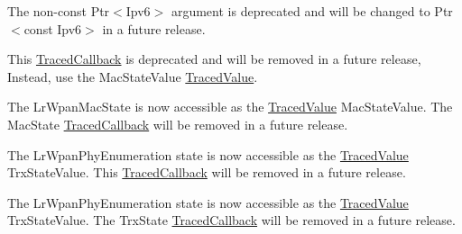 \begin{DoxyRefList}
\item[\label{deprecated__deprecated000011}%
\hypertarget{deprecated__deprecated000011}{}%
Member \hyperlink{classns3_1_1Ipv6L3Protocol_a5b967a1009f9c57047f135573fd5519f}{ns3\+:\+:Ipv6\+L3\+Protocol\+:\+:Tx\+Rx\+Traced\+Callback} )(Ptr$<$ const Packet $>$ packet, Ptr$<$ Ipv6 $>$ ipv6, uint32\+\_\+t interface)]The non-\/const {\ttfamily Ptr$<$\+Ipv6$>$} argument is deprecated and will be changed to {\ttfamily Ptr$<$const Ipv6$>$} in a future release.  
\item[\label{deprecated__deprecated000017}%
\hypertarget{deprecated__deprecated000017}{}%
Member \hyperlink{classns3_1_1LrWpanMac_a7545ecfb4bdf7436739d00507872d248}{ns3\+:\+:Lr\+Wpan\+Mac\+:\+:m\+\_\+mac\+State\+Logger} ]This \hyperlink{classns3_1_1TracedCallback}{Traced\+Callback} is deprecated and will be removed in a future release, Instead, use the {\ttfamily Mac\+State\+Value} \hyperlink{classns3_1_1TracedValue}{Traced\+Value}.  
\item[\label{deprecated__deprecated000016}%
\hypertarget{deprecated__deprecated000016}{}%
Member \hyperlink{classns3_1_1LrWpanMac_ad847a4537bebb10c39f656f1ebdb87f5}{ns3\+:\+:Lr\+Wpan\+Mac\+:\+:State\+Traced\+Callback} )(Lr\+Wpan\+Mac\+State old\+State, Lr\+Wpan\+Mac\+State new\+State)]The Lr\+Wpan\+Mac\+State is now accessible as the \hyperlink{classns3_1_1TracedValue}{Traced\+Value} {\ttfamily Mac\+State\+Value}. The {\ttfamily Mac\+State} \hyperlink{classns3_1_1TracedCallback}{Traced\+Callback} will be removed in a future release.  
\item[\label{deprecated__deprecated000019}%
\hypertarget{deprecated__deprecated000019}{}%
Member \hyperlink{classns3_1_1LrWpanPhy_ae48d12b3f7dd9ebc93ae1a7e0d570f52}{ns3\+:\+:Lr\+Wpan\+Phy\+:\+:m\+\_\+trx\+State\+Logger} ]The Lr\+Wpan\+Phy\+Enumeration state is now accessible as the \hyperlink{classns3_1_1TracedValue}{Traced\+Value} {\ttfamily Trx\+State\+Value}. This \hyperlink{classns3_1_1TracedCallback}{Traced\+Callback} will be removed in a future release.  
\item[\label{deprecated__deprecated000018}%
\hypertarget{deprecated__deprecated000018}{}%
Member \hyperlink{classns3_1_1LrWpanPhy_aea965ae9baca8ac61deab4594b50384a}{ns3\+:\+:Lr\+Wpan\+Phy\+:\+:State\+Traced\+Callback} )(\hyperlink{classns3_1_1Time}{Time} time, Lr\+Wpan\+Phy\+Enumeration old\+State, Lr\+Wpan\+Phy\+Enumeration new\+State)]The Lr\+Wpan\+Phy\+Enumeration state is now accessible as the \hyperlink{classns3_1_1TracedValue}{Traced\+Value} {\ttfamily Trx\+State\+Value}. The {\ttfamily Trx\+State} \hyperlink{classns3_1_1TracedCallback}{Traced\+Callback} will be removed in a future release.  

\end{DoxyRefList}
